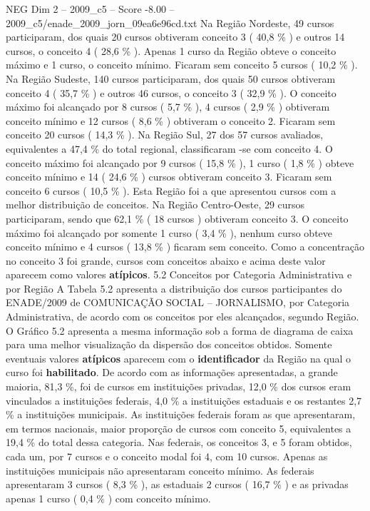 \begin{textsample}{NEG Dim 2 – 2009\_c5 – Score -8.00 – 2009\_c5/enade\_2009\_jorn\_09ea6e96cd.txt}
Na Região Nordeste, 49 cursos participaram, dos quais 20 cursos obtiveram conceito 3 ( 40,8 \% ) e outros 14 cursos, o conceito 4 ( 28,6 \% ).
Apenas 1 curso da Região obteve o conceito máximo e 1 curso, o conceito mínimo.
Ficaram sem conceito 5 cursos ( 10,2 \% ).
Na Região Sudeste, 140 cursos participaram, dos quais 50 cursos obtiveram conceito 4 ( 35,7 \% ) e outros 46 cursos, o conceito 3 ( 32,9 \% ).
O conceito máximo foi alcançado por 8 cursos ( 5,7 \% ), 4 cursos ( 2,9 \% ) obtiveram conceito mínimo e 12 cursos ( 8,6 \% ) obtiveram o conceito 2.
Ficaram sem conceito 20 cursos ( 14,3 \% ).
Na Região Sul, 27 dos 57 cursos avaliados, equivalentes a 47,4 \% do total regional, classificaram -se com conceito 4.
O conceito máximo foi alcançado por 9 cursos ( 15,8 \% ), 1 curso ( 1,8 \% ) obteve conceito mínimo e 14 ( 24,6 \% ) cursos obtiveram conceito 3.
Ficaram sem conceito 6 cursos ( 10,5 \% ).
Esta Região foi a que apresentou cursos com a melhor distribuição de conceitos.
Na Região Centro-Oeste, 29 cursos participaram, sendo que 62,1 \% ( 18 cursos ) obtiveram conceito 3.
O conceito máximo foi alcançado por somente 1 curso ( 3,4 \% ), nenhum curso obteve conceito mínimo e 4 cursos ( 13,8 \% ) ficaram sem conceito.
Como a concentração no conceito 3 foi grande, cursos com conceitos abaixo e acima deste valor aparecem como valores \textbf{atípicos}. 5.2 Conceitos por Categoria Administrativa e por Região A Tabela 5.2 apresenta a distribuição dos cursos participantes do ENADE/2009 de COMUNICAÇÃO SOCIAL – JORNALISMO, por Categoria Administrativa, de acordo com os conceitos por eles alcançados, segundo Região.
O Gráfico 5.2 apresenta a mesma informação sob a forma de diagrama de caixa para uma melhor visualização da dispersão dos conceitos obtidos.
Somente eventuais valores \textbf{atípicos} aparecem com o \textbf{identificador} da Região na qual o curso foi \textbf{habilitado}.
De acordo com as informações apresentadas, a grande maioria, 81,3 \%, foi de cursos em instituições privadas, 12,0 \% dos cursos eram vinculados a instituições federais, 4,0 \% a instituições estaduais e os restantes 2,7 \% a instituições municipais.
As instituições federais foram as que apresentaram, em termos nacionais, maior proporção de cursos com conceito 5, equivalentes a 19,4 \% do total dessa categoria.
Nas federais, os conceitos 3, e 5 foram obtidos, cada um, por 7 cursos e o conceito modal foi 4, com 10 cursos.
Apenas as instituições municipais não apresentaram conceito mínimo.
As federais apresentaram 3 cursos ( 8,3 \% ), as estaduais 2 cursos ( 16,7 \% ) e as privadas apenas 1 curso ( 0,4 \% ) com conceito mínimo.

\end{textsample}
